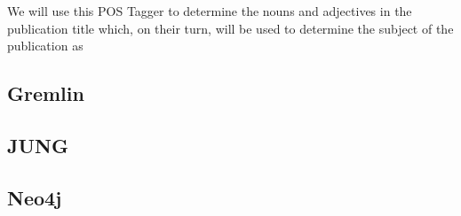 We will use this POS Tagger to determine the nouns and adjectives in the publication title which, on their turn, will be used to determine the subject of the publication as 

\subsection{Gremlin}

\subsection{JUNG}

\subsection{Neo4j}
